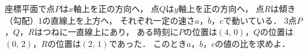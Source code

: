 \begin{problem}
座標平面で点$P$は$x$軸上を正の方向へ，
点$Q$は$y$軸上を正の方向へ，
点$R$は傾き（勾配）1の直線上を上方へ，
それぞれ一定の速さ$a$，$b$，$c$で動いている．
3点$P$，$Q$，$R$はつねに一直線上にあり，
ある時刻に$P$の位置は$(4, \, 0)$，$Q$の位置は$(0, \, 2)$，$R$の位置は$(2, \, 1)$であった．
このとき$a$，$b$，$c$の値の比を求めよ．
\end{problem}
